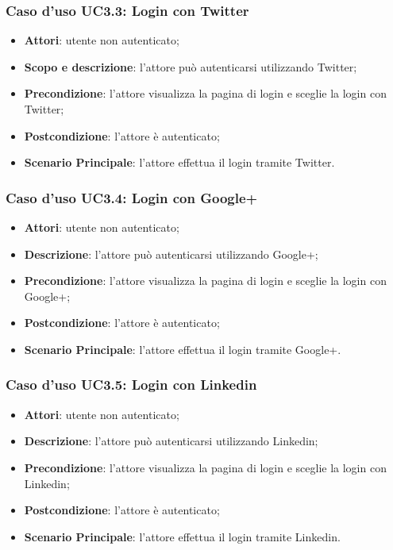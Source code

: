 \subsubsection{Caso d'uso UC3.3: Login con Twitter}
\begin{itemize}
	\item \textbf{Attori}: utente non autenticato;
	\item \textbf{Scopo e descrizione}: l'attore può autenticarsi utilizzando Twitter;
	\item \textbf{Precondizione}: l'attore visualizza la pagina di login e sceglie la login con Twitter;
	\item \textbf{Postcondizione}: l'attore è autenticato;
	\item \textbf{Scenario Principale}: l'attore effettua il login tramite Twitter.
\end{itemize}
\subsubsection{Caso d'uso UC3.4: Login con Google+}
\begin{itemize}
	\item \textbf{Attori}: utente non autenticato;
	\item \textbf{Descrizione}: l'attore può autenticarsi utilizzando Google+;
	\item \textbf{Precondizione}: l'attore visualizza la pagina di login e sceglie la login con Google+;
	\item \textbf{Postcondizione}: l'attore è autenticato;
	\item \textbf{Scenario Principale}: l'attore effettua il login tramite Google+.
\end{itemize}
\subsubsection{Caso d'uso UC3.5: Login con Linkedin}
\begin{itemize}
	\item \textbf{Attori}: utente non autenticato;
	\item \textbf{Descrizione}: l'attore può autenticarsi utilizzando Linkedin;
	\item \textbf{Precondizione}: l'attore visualizza la pagina di login e sceglie la login con Linkedin;
	\item \textbf{Postcondizione}: l'attore è autenticato;
	\item \textbf{Scenario Principale}: l'attore effettua il login tramite Linkedin.
\end{itemize}